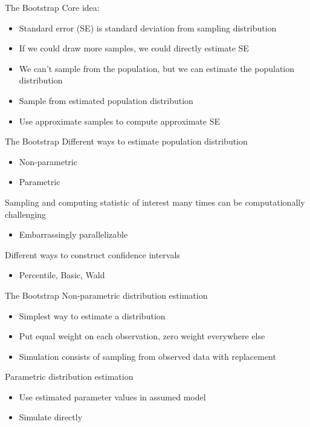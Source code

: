 \documentclass[14pt]{beamer}
\begin{document}
\begin{frame}{The Bootstrap}
    Core idea:
    \begin{itemize}
        \item Standard error (SE) is standard deviation from sampling distribution
        \item If we could draw more samples, we could directly estimate SE
        \item We can't sample from the population, but we can estimate the population distribution
        \item Sample from estimated population distribution
        \item Use approximate samples to compute approximate SE
    \end{itemize}
\end{frame}

\begin{frame}{The Bootstrap}
    Different ways to estimate population distribution
    \begin{itemize}
        \item Non-parametric
        \item Parametric \newline
    \end{itemize}

    Sampling and computing statistic of interest many times can be computationally challenging
    \begin{itemize}
        \item Embarrassingly parallelizable \newline
    \end{itemize}

    Different ways to construct confidence intervals
    \begin{itemize}
        \item Percentile, Basic, Wald
    \end{itemize}
\end{frame}




\begin{frame}{The Bootstrap}
    Non-parametric distribution estimation
    \begin{itemize}
        \item Simplest way to estimate a distribution
        \item Put equal weight on each observation, zero weight everywhere else
        \item Simulation consists of sampling from observed data with replacement \newline
    \end{itemize}

    Parametric distribution estimation
    \begin{itemize}
        \item Use estimated parameter values in assumed model
        \item Simulate directly 
    \end{itemize}

\end{frame}
\end{document}
